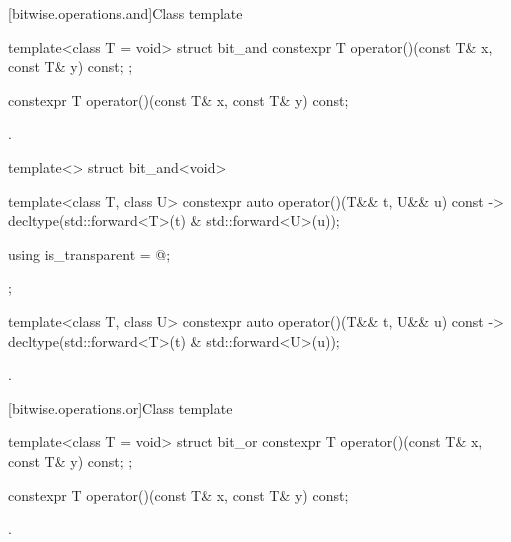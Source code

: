 [bitwise.operations.and]{Class template }

%
\begin{itemdecl}
template<class T = void> struct bit_and {
  constexpr T operator()(const T& x, const T& y) const;
};
\end{itemdecl}

%
\begin{itemdecl}
constexpr T operator()(const T& x, const T& y) const;
\end{itemdecl}

\begin{itemdescr}
\pnum
\returns
{}.
\end{itemdescr}

%
\begin{itemdecl}
template<> struct bit_and<void> {
  template<class T, class U> constexpr auto operator()(T&& t, U&& u) const
    -> decltype(std::forward<T>(t) & std::forward<U>(u));

  using is_transparent = @\unspec@;
};
\end{itemdecl}

%
\begin{itemdecl}
template<class T, class U> constexpr auto operator()(T&& t, U&& u) const
    -> decltype(std::forward<T>(t) & std::forward<U>(u));
\end{itemdecl}

\begin{itemdescr}
\pnum
\returns
{}.
\end{itemdescr}

[bitwise.operations.or]{Class template }

%
\begin{itemdecl}
template<class T = void> struct bit_or {
  constexpr T operator()(const T& x, const T& y) const;
};
\end{itemdecl}

%
\begin{itemdecl}
constexpr T operator()(const T& x, const T& y) const;
\end{itemdecl}

\begin{itemdescr}
\pnum
\returns
{}.
\end{itemdescr}

